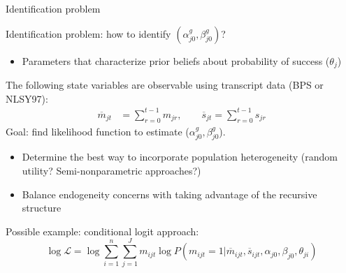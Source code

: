 \documentclass[compress, 8pt]{beamer}
\begin{document}
\begin{frame}{Identification problem}\label{identification}

Identification problem: how to identify $(\alpha_{j0}^g, \beta_{j0}^g)$?
\begin{itemize}
    \item Parameters that characterize prior beliefs about probability of success ($\theta_j$)
\end{itemize}


\vspace{2ex}
The following state variables are observable using transcript data (BPS or NLSY97):
\begin{align*}
    \overline{m}_{jt} &= \sum_{r=0}^{t-1} m_{jr}, \quad \quad \overline{s}_{jt} = \sum_{r=0}^{t-1} s_{jr}
\end{align*}
Goal: find likelihood function to estimate ($\alpha_{j0}^g, \beta_{j0}^g$).
\begin{itemize}
    \item Determine the best way to incorporate population heterogeneity (random utility? Semi-nonparametric approaches?)
    \item Balance endogeneity concerns with taking advantage of the recursive structure
\end{itemize}

\vspace{2ex}
Possible example: conditional logit approach:
\begin{equation*}
    \log \mathcal{L} = \log \sum_{i = 1}^n \sum_{j=1}^J m_{ijt} \log P(m_{ijt} = 1 \vert \overline{m}_{ijt}, \overline{s}_{ijt}, \alpha_{j0}, \beta_{j0}, \theta_{ji})
\end{equation*}

\end{frame}
\end{document}
